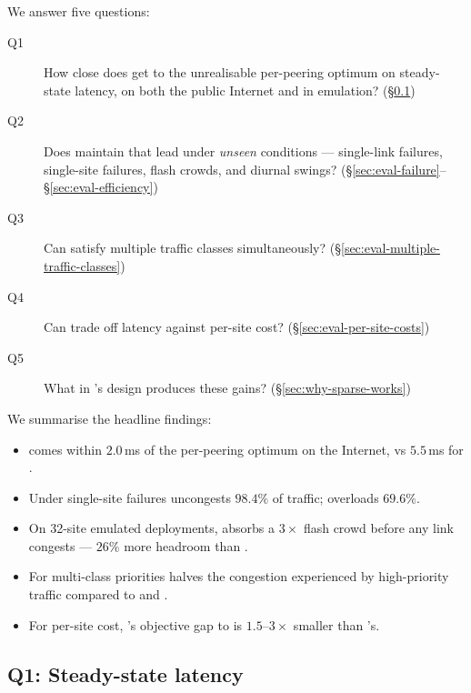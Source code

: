 \documentclass[acmsmall,anonymous,review,nonacm,10pt]{acmart}
\begin{document}
We answer five questions:
\begin{description}
\item[Q1] How close does \sparse get to the unrealisable
          per-peering optimum on steady-state latency, on both
          the public Internet and in emulation?
          (\S\ref{sec:eval-steady-state})
\item[Q2] Does \sparse maintain that lead under \emph{unseen}
          conditions --- single-link failures, single-site
          failures, flash crowds, and diurnal swings?
          (\S\ref{sec:eval-failure}--\S\ref{sec:eval-efficiency})
\item[Q3] Can \sparse satisfy multiple traffic classes
          simultaneously? (\S\ref{sec:eval-multiple-traffic-classes})
\item[Q4] Can \sparse trade off latency against per-site cost?
          (\S\ref{sec:eval-per-site-costs})
\item[Q5] What in \sparse's design produces these gains?
          (\S\ref{sec:why-sparse-works})
\end{description}

We summarise the headline findings:
\begin{itemize}
\item \sparse comes within $2.0$\,ms of the per-peering optimum
      on the Internet, vs $5.5$\,ms for \painter.
\item Under single-site failures \sparse uncongests
      $98.4\%$ of traffic; \painter overloads $69.6\%$.
\item On 32-site emulated deployments, \sparse absorbs a
      $3\times$ flash crowd before any link congests --- $26\%$
      more headroom than \painter.
\item For multi-class priorities \sparse halves the congestion
      experienced by high-priority traffic compared to \painter
      and \ucast.
\item For per-site cost, \sparse's objective gap to \expensive is
      $1.5$--$3\times$ smaller than \painter's.
\end{itemize}

\subsection{Q1: Steady-state latency}
\label{sec:eval-steady-state}
\end{document}

